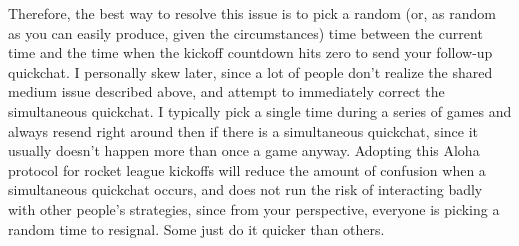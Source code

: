 \documentclass{article}
\begin{document}
Therefore, the best way to resolve this issue is to pick a random (or, as random as you can easily produce, given the circumstances) time between the current time and the time when the kickoff countdown hits zero to send your follow-up quickchat. I personally skew later, since a lot of people don’t realize the shared medium issue described above, and attempt to immediately correct the simultaneous quickchat. I typically pick a single time during a series of games and always resend right around then if there is a simultaneous quickchat, since it usually doesn’t happen more than once a game anyway. Adopting this Aloha protocol for rocket league kickoffs will reduce the amount of confusion when a simultaneous quickchat occurs, and does not run the risk of interacting badly with other people’s strategies, since from your perspective, everyone is picking a random time to resignal. Some just do it quicker than others.\\
\end{document}
